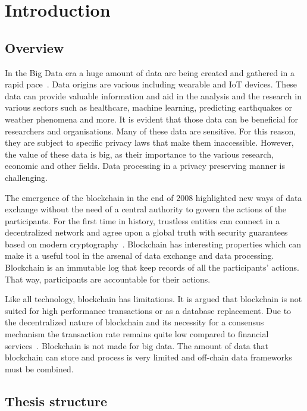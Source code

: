 \chapter{Introduction}
\label{introduction}

\section{Overview}
\label{introduction:overview}

In the Big Data era a huge amount of data are being created and gathered in a rapid pace~\cite{10.1109/SPW.2015.27}. Data origins are various including wearable and IoT devices. These data can provide valuable information and aid in the analysis and the research in various sectors such as healthcare, machine learning, predicting earthquakes or weather phenomena and more. It is evident that those data can be beneficial for researchers and organisations. Many of these data are sensitive. For this reason, they are subject to specific privacy laws that make them inaccessible. However, the value of these data is big, as their importance to the various research, economic and other fields. Data processing in a privacy preserving manner is challenging.

The emergence of the blockchain in the end of 2008 highlighted new ways of data exchange without the need of a central authority to govern the actions of the participants. For the first time in history, trustless entities can connect in a decentralized network and agree upon a global truth with security guarantees based on modern cryptography~\cite{10.1007/978-3-662-46803-6_10}. Blockchain has interesting properties which can make it a useful tool in the arsenal of data exchange and data processing. Blockchain is an immutable log that keep records of all the participants' actions. That way, participants are accountable for their actions.

Like all technology, blockchain has limitations. It is argued that blockchain is not suited for high performance transactions or as a database replacement. Due to the decentralized nature of blockchain and its necessity for a consensus mechanism the transaction rate remains quite low compared to financial services~\cite{Sompolinsky2015,Zohar:2015:BUH:2817191.2701411}.
Blockchain is not made for big data. The amount of data that blockchain can store and process is very limited and off-chain data frameworks must be combined.


\section{Thesis structure}
\label{introduction:structure}

